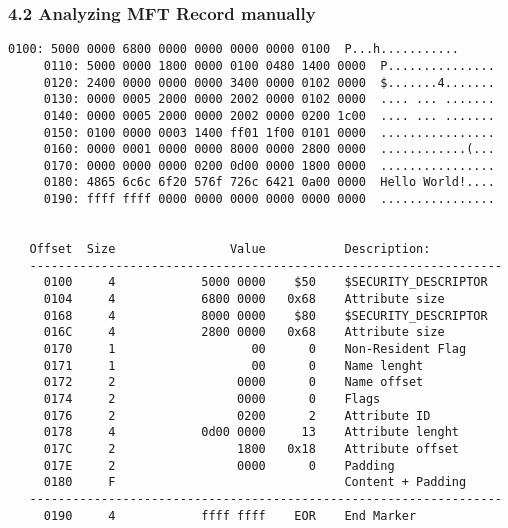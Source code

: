 \begin{frame}[fragile]
  \frametitle{4.2 Analyzing MFT Record manually}
  \begin{lstlisting}[basicstyle=\tiny]
     0100: 5000 0000 6800 0000 0000 0000 0000 0100  P...h...........
     0110: 5000 0000 1800 0000 0100 0480 1400 0000  P...............
     0120: 2400 0000 0000 0000 3400 0000 0102 0000  $.......4.......
     0130: 0000 0005 2000 0000 2002 0000 0102 0000  .... ... .......
     0140: 0000 0005 2000 0000 2002 0000 0200 1c00  .... ... .......
     0150: 0100 0000 0003 1400 ff01 1f00 0101 0000  ................
     0160: 0000 0001 0000 0000 8000 0000 2800 0000  ............(...
     0170: 0000 0000 0000 0200 0d00 0000 1800 0000  ................
     0180: 4865 6c6c 6f20 576f 726c 6421 0a00 0000  Hello World!....
     0190: ffff ffff 0000 0000 0000 0000 0000 0000  ................


   Offset  Size                Value           Description:
   ------------------------------------------------------------------
     0100     4            5000 0000    $50    $SECURITY_DESCRIPTOR
     0104     4            6800 0000   0x68    Attribute size
     0168     4            8000 0000    $80    $SECURITY_DESCRIPTOR
     016C     4            2800 0000   0x68    Attribute size
     0170     1                   00      0    Non-Resident Flag
     0171     1                   00      0    Name lenght
     0172     2                 0000      0    Name offset
     0174     2                 0000      0    Flags
     0176     2                 0200      2    Attribute ID
     0178     4            0d00 0000     13    Attribute lenght
     017C     2                 1800   0x18    Attribute offset
     017E     2                 0000      0    Padding
     0180     F                                Content + Padding
   ------------------------------------------------------------------
     0190     4            ffff ffff    EOR    End Marker
  \end{lstlisting}
\end{frame}


